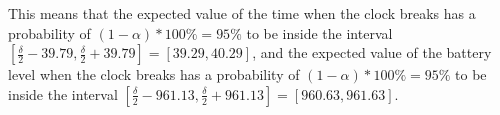 This means that the expected value of the time when the clock breaks has a probability of $(1-\alpha)*100\% = 95\%$ to be inside the interval $[\frac{\delta}{2} - 39.79, \frac{\delta}{2} + 39.79] = [39.29, 40.29]$, and the expected value of the battery level when the clock breaks has a probability of $(1-\alpha)*100\% = 95\%$ to be inside the interval $[\frac{\delta}{2} - 961.13, \frac{\delta}{2} + 961.13] = [960.63, 961.63]$.

